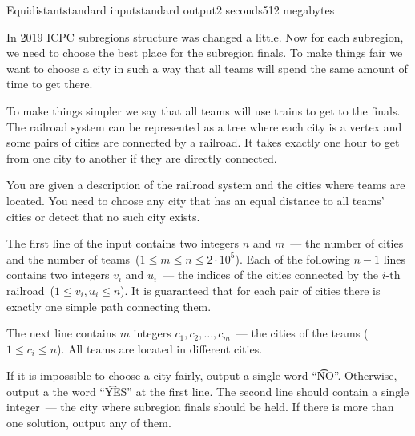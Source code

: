 \begin{problem}{Equidistant}{standard input}{standard output}{2 seconds}{512 megabytes}

In 2019 ICPC subregions structure was changed a little. Now for each subregion, we need to choose the best place for the subregion finals. To make things fair we want to choose a city in such a way that all teams will spend the same amount of time to get there.

To make things simpler we say that all teams will use trains to get to the finals. The railroad system can be represented as a tree where each city is a vertex and some pairs of cities are connected by a railroad. It takes exactly one hour to get from one city to another if they are directly connected. 

You are given a description of the railroad system and the cities where teams are located. You need to choose any city that has an equal distance to all teams' cities or detect that no such city exists.

\InputFile
The first line of the input contains two integers $n$ and $m$~--- the number of cities and the number of teams~($1 \le m \le n \le 2 \cdot 10^5$). Each of the following $n - 1$ lines contains two integers $v_i$ and $u_i$~--- the indices of the cities connected by the $i$-th railroad~($1 \le v_i, u_i \le n$). It is guaranteed that for each pair of cities there is exactly one simple path connecting them.


The next line contains $m$ integers $c_1, c_2, \ldots, c_m$~--- the cities of the teams ($1 \le c_i \le n$). All teams are located in different cities.

\OutputFile
If it is impossible to choose a city fairly, output a single word ``\t{NO}''. Otherwise, output a the word ``\t{YES}'' at the first line. The second line should contain a single integer~--- the city where subregion finals should be held. If there is more than one solution, output any of them.

\Examples

\begin{example}
%
%
\end{example}

\end{problem}

